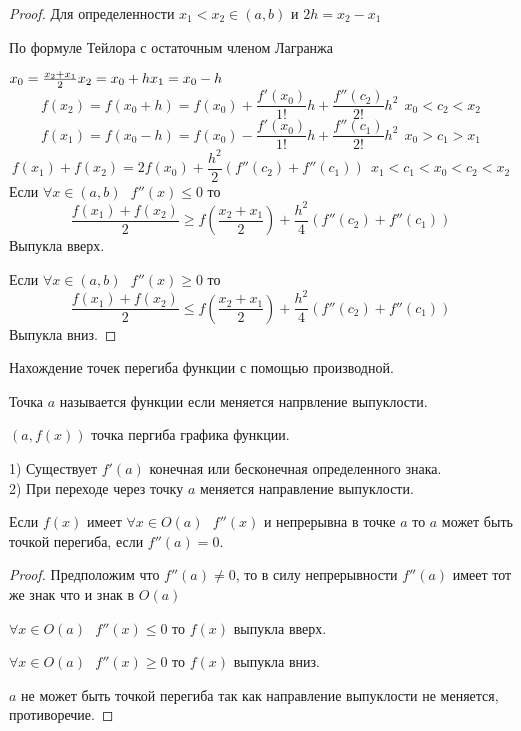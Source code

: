 \begin{proof}
  Для определенности $x_1 < x_2 \in (a,b)$ и $2h = x_2 - x_1$

  По формуле Тейлора с остаточным членом Лагранжа

  $
  x_0 = \frac{x_2 + x_1}{2}\\
  x_2 = x_0 + h\\
  x_1 = x_0 - h\\
  $
  $$
  f(x_2) = f(x_0 + h) = f(x_0) + \frac{f'(x_0)}{1!}h +
    \frac{f''(c_2)}{2!}h^2 ~~ x_0 < c_2 < x_2
  $$
  $$
  f(x_1) = f(x_0 - h) = f(x_0) - \frac{f'(x_0)}{1!}h +
    \frac{f''(c_1)}{2!}h^2 ~~ x_0 > c_1 > x_1
  $$
  $$
  f(x_1) + f(x_2) = 2f(x_0) + \frac{h^2}{2}(f''(c_2) + f''(c_1)) ~~
  x_1 < c_1 < x_0 < c_2 < x_2
  $$
  Если $\forall x \in (a,b) ~~~ f''(x) \le 0$ то
  $$
  \frac{f(x_1) + f(x_2)}{2} \ge f(\frac{x_2 + x_1}{2})
  + \frac{h^2}{4}(f''(c_2) + f''(c_1))
  $$
  Выпукла вверх.

  Если $\forall x \in (a,b) ~~~ f''(x) \ge 0$ то
  $$
  \frac{f(x_1) + f(x_2)}{2} \le f(\frac{x_2 + x_1}{2})
  + \frac{h^2}{4}(f''(c_2) + f''(c_1))
  $$
  Выпукла вниз.
\end{proof}

\begin{title}[\Large]
  Нахождение точек перегиба функции с помощью производной.
\end{title}

\begin{defin}
  Точка $a$ называется  функции если меняется напрвление
  выпуклости.

  $(a, f(x))$ точка пергиба графика функции.
\end{defin}

  1) Существует $f'(a)$ конечная или бесконечная определенного знака.\\
  2) При переходе через точку $a$ меняется направление выпуклости.

\begin{block}
  Если $f(x)$ имеет $\forall x \in O(a) ~~~ f''(x)$ и непрерывна в
  точке $a$ то $a$ может быть точкой перегиба, если $f''(a) = 0$.
\end{block}

\begin{proof}
  Предположим что $f''(a)\not= 0$, то в силу непрерывности $f''(a)$ имеет
  тот же знак что и знак в $O(a)$

  $\forall x \in O(a) ~~~ f''(x) \le 0$ то $f(x)$ выпукла вверх.

  $\forall x \in O(a) ~~~ f''(x) \ge 0$ то $f(x)$ выпукла вниз.

  $a$ не может быть точкой перегиба так как направление выпуклости не меняется,
  противоречие.
\end{proof}

